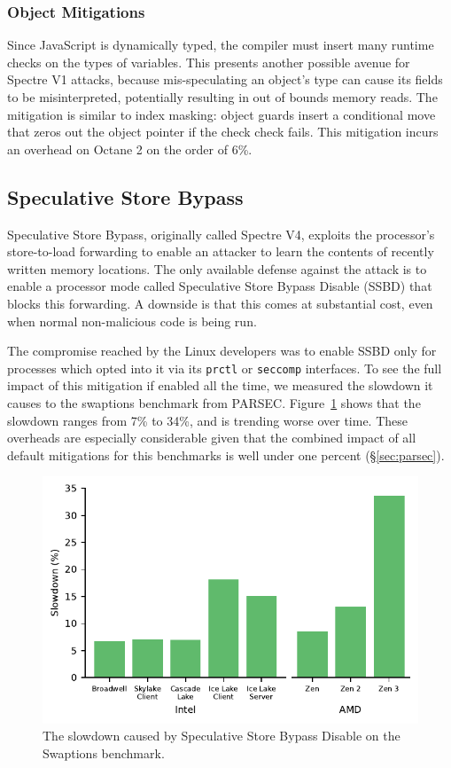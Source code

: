 \subsubsection{Object Mitigations}

Since JavaScript is dynamically typed, the compiler must insert many runtime checks on the types of variables.
This presents another possible avenue for Spectre V1 attacks, because mis-speculating an object's type can cause its fields to be misinterpreted, potentially resulting in out of bounds memory reads.
The mitigation is similar to index masking: object guards insert a conditional move that zeros out the object pointer if the check check fails.
This mitigation incurs an overhead on Octane 2 on the order of 6\%.

\subsection{Speculative Store Bypass}
\label{sec:ssb}

Speculative Store Bypass, originally called Spectre V4, exploits the processor's store-to-load forwarding to enable an attacker to learn the contents of recently written memory locations.
The only available defense against the attack is to enable a processor mode called Speculative Store Bypass Disable (SSBD) that blocks this forwarding.
A downside is that this comes at substantial cost, even when normal non-malicious code is being run.

The compromise reached by the Linux developers was to enable SSBD only for processes which opted into it via its \texttt{prctl} or \texttt{seccomp} interfaces.
To see the full impact of this mitigation if enabled all the time, we measured the slowdown it causes to the swaptions benchmark from PARSEC.
Figure~\ref{fig:ssbd} shows that the slowdown ranges from 7\% to 34\%,
and is trending worse over time.
These overheads are especially considerable given that the combined
impact of all default mitigations for this benchmarks is well under one percent (\S\ref{sec:parsec}).

\begin{figure}[h]
  \includegraphics[width=\columnwidth]{plots/ssbd.pdf}
  \caption{The slowdown caused by Speculative Store Bypass Disable on the Swaptions benchmark.}
  \label{fig:ssbd}
\end{figure}

